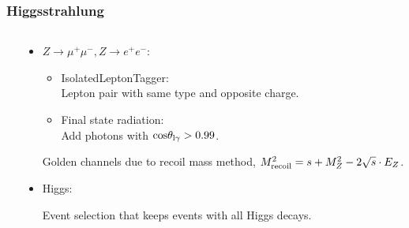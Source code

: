 \begin{frame}
    \frametitle{Higgsstrahlung}
    \begin{columns}[c,onlytextwidth]
    \begin{column}{0.38\textwidth}
    \resizebox{\textwidth}{!}{
        
    }
    \end{column}
    \begin{column}{0.62\textwidth}
    \begin{itemize}
        \item \textcolor{xemphcolor}{
            $Z \rightarrow \mu^+ \mu^-, Z \rightarrow e^+ e^-$}:


            \begin{itemize}
                \item IsolatedLeptonTagger: \\
                    Lepton pair with same type and opposite charge.
                \item Final state radiation: \\
                    Add photons with $\mathrm{cos}\theta_{\mathrm{l\gamma}} > 0.99$.
            \end{itemize}
            Golden channels due to recoil mass method,
            $M_{\textnormal{recoil}}^2 = s + M_Z^2 - 2\sqrt{s} \cdot E_Z$.
        \item \textcolor{xemphcolor}{Higgs}:

            Event selection that keeps events with all Higgs decays.
    \end{itemize}
    \end{column}
    \end{columns}
    \end{frame}
